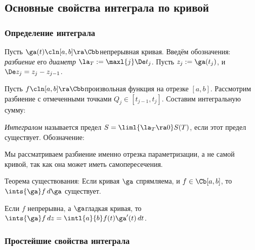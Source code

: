 \documentclass[a4paper]{article}
\begin{document}
\begin{solution}
\subsection{Основные свойства интеграла по кривой}

\subsubsection{Определение интеграла}

Пусть $\ga(t)\cln [a,b]\ra\Cbb$\т непрерывная кривая. Введём обозначения: \emph{разбиение}
его \emph{диаметр} $\la_T := \maxl{j} \De t_j$. Пусть $z_j := \ga(t_j)$, и $\De z_j = z_j - z_{j-1}$.

Пусть $f\cln[a,b] \ra \Cbb$\т произвольная функция на отрезке $[a,b]$. Рассмотрим разбиение
с отмеченными точками $Q_j \in [t_{j - 1}, t_j]$. Составим интегральную сумму:

\begin{df}
\emph{Интегралом} называется предел $S = \liml{\la_T \ra 0} S(T)$, если этот предел существует.
Обозначение:
\end{df}

\begin{note}
Мы рассматриваем разбиение именно отрезка параметризации, а не самой кривой, так как она может
иметь самопересечения.
\end{note}

\begin{problem}
\begin{nums}{-2}
\item Теорема существования: Если кривая $\ga$ спрямляема, и $f\in\Cb[a,b]$, то $\ints{\ga} f\,d\ga$ существует.
\item Если $f$ непрерывна, а $\ga$\т гладкая кривая, то $\ints{\ga} f\,dz = \intl{a}{b}f(t)\ga'(t)\,dt$.
\end{nums}
\end{problem}

\subsubsection{Простейшие свойства интеграла}


\end{solution}
\end{document}
